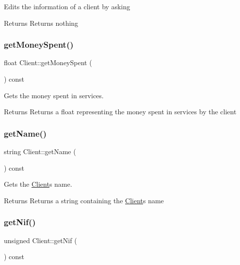Edits the information of a client by asking

\begin{DoxyReturn}{Returns}
Returns nothing 
\end{DoxyReturn}
\mbox{\label{class_client_a226ff919591e7fdfa6c386e9aa5300a5}} 
\subsubsection{\texorpdfstring{get\+Money\+Spent()}{getMoneySpent()}}
{\footnotesize\ttfamily float Client\+::get\+Money\+Spent (\begin{DoxyParamCaption}{ }\end{DoxyParamCaption}) const}



Gets the money spent in services. 

\begin{DoxyReturn}{Returns}
Returns a float representing the money spent in services by the client 
\end{DoxyReturn}
\mbox{\label{class_client_a5c473ba52d7678744edec9e51052c947}} 
\subsubsection{\texorpdfstring{get\+Name()}{getName()}}
{\footnotesize\ttfamily string Client\+::get\+Name (\begin{DoxyParamCaption}{ }\end{DoxyParamCaption}) const}



Gets the \hyperlink{class_client}{Client}\textquotesingle{}s name. 

\begin{DoxyReturn}{Returns}
Returns a string containing the \hyperlink{class_client}{Client}\textquotesingle{}s name 
\end{DoxyReturn}
\mbox{\label{class_client_a35c9fed8cdb36d28fd5e51bd2aee852e}} 
\subsubsection{\texorpdfstring{get\+Nif()}{getNif()}}
{\footnotesize\ttfamily unsigned Client\+::get\+Nif (\begin{DoxyParamCaption}{ }\end{DoxyParamCaption}) const}



